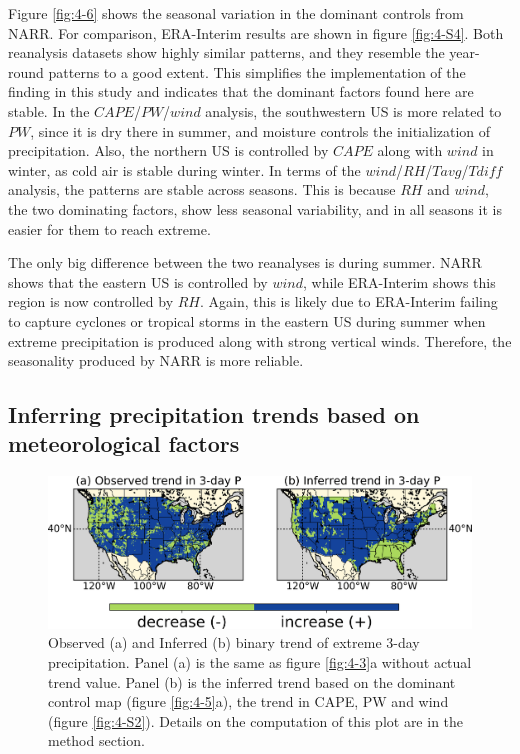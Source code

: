 Figure \ref{fig:4-6} shows the seasonal variation in the dominant controls from NARR. For comparison, ERA-Interim results are shown in figure \ref{fig:4-S4}. Both reanalysis datasets show highly similar patterns, and they resemble the year-round patterns to a good extent. This simplifies the implementation of the finding in this study and indicates that the dominant factors found here are stable. In the $CAPE$/$PW$/$wind$ analysis, the southwestern US is more related to $PW$, since it is dry there in summer, and moisture controls the initialization of precipitation. Also, the northern US is controlled by $CAPE$ along with $wind$ in winter, as cold air is stable during winter. In terms of the $wind$/$RH$/$Tavg$/$Tdiff$ analysis, the patterns are stable across seasons. This is because $RH$ and $wind$, the two dominating factors, show less seasonal variability, and in all seasons it is easier for them to reach extreme.

The only big difference between the two reanalyses is during summer. NARR shows that the eastern US is controlled by $wind$, while ERA-Interim shows this region is now controlled by $RH$. Again, this is likely due to ERA-Interim failing to capture cyclones or tropical storms in the eastern US during summer when extreme precipitation is produced along with strong vertical winds. Therefore, the seasonality produced by NARR is more reliable.

\subsection{Inferring precipitation trends based on meteorological factors}

\begin{figure}[htbp]
	\includegraphics[width=\linewidth]{pics/ch4/fig7.png}
	\caption{Observed (a) and Inferred (b) binary trend of extreme 3-day precipitation. Panel (a) is the same as figure \ref{fig:4-3}a without actual trend value. Panel (b) is the inferred trend based on the dominant control map (figure \ref{fig:4-5}a), the trend in CAPE, PW and wind (figure \ref{fig:4-S2}). Details on the computation of this plot are in the method section.}
	\label{fig:4-7}
\end{figure}

